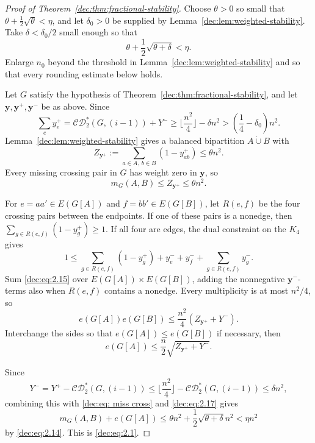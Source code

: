 \documentclass[11pt]{article}
\numberwithin{equation}{section}
\theoremstyle{remark}
\newcommand{\dotcupunion}{\mathbin{\dot\cup}}
\newcommand{\CDstar}{\mathcal{CD}^{*}}
\begin{document}
\begin{proof}[Proof of Theorem~\ref{dec:thm:fractional-stability}]
Choose \(\theta>0\) so small that
\(\theta+\frac12\sqrt\theta<\eta\), and let \(\delta_0>0\) be supplied by Lemma~\ref{dec:lem:weighted-stability}.
Take \(\delta<\delta_0/2\) small enough so that
\begin{equation}\label{dec:eq:2.14}
  \theta+\frac12\sqrt{\theta+\delta}<\eta.
\end{equation}
Enlarge \(n_0\) beyond the threshold in Lemma~\ref{dec:lem:weighted-stability} and
so that every rounding estimate below holds.

Let \(G\) satisfy the hypothesis of Theorem~\ref{dec:thm:fractional-stability},
and let \(\mathbf{y},\mathbf{y}^+,\mathbf{y}^-\) be as above. Since
\begin{equation*}
  \sum_e y_e^+=\CDstar_2(G,(i-1))+Y^-
  \ge \lfloor \frac{n^2}{4}\rfloor-\delta n^2>(\frac14-\delta_0)n^2.
\end{equation*}
Lemma~\ref{dec:lem:weighted-stability} gives a balanced bipartition \(A\dotcupunion B\) with
\begin{equation*}
Z_{\mathbf{y}^+}:=\sum_{a\in A,\ b\in B}(1-y^+_{ab})\le\theta n^2.
\end{equation*}
Every missing crossing pair in \(G\) has weight zero in \(\mathbf y\), so
\begin{equation}\label{dec:eq: miss cross}
 m_G(A,B)\le Z_{\mathbf{y}^+}\le\theta n^2.
\end{equation}

For \(e=aa'\in E(G[A])\) and \(f=bb'\in E(G[B])\), let \(R(e,f)\) be the four crossing
pairs between the endpoints.  If one of these pairs is a nonedge, then
\(\sum_{g\in R(e,f)}(1-y^+_g)\ge1\).  If all four are edges, the dual constraint on the \(K_4\) gives
\begin{equation}\label{dec:eq:2.15}
  1\le
  \sum_{g\in R(e,f)}(1-y^+_g)
  +y_e^-+y^-_f+\sum_{g\in R(e,f)}y^-_g.
\end{equation}
Sum \eqref{dec:eq:2.15} over \(E(G[A])\times E(G[B])\), adding the nonnegative \(\mathbf{y}^-\)-terms also when
\(R(e,f)\) contains a nonedge. Every multiplicity is at most \(n^2/4\), so
\begin{equation*}
  e(G[A])e(G[B])\le \frac{n^2}{4}(Z_{\mathbf{y}^+}+Y^-).
\end{equation*}
Interchange the sides so that \(e(G[A])\le e(G[B])\) if necessary, then
\begin{equation}\label{dec:eq:2.17}
  e(G[A])\le \frac n2\sqrt{Z_{\mathbf{y}^+}+Y^-}.
\end{equation}

Since
\begin{equation*}
Y^-=Y^+-\CDstar_2(G,(i-1))\le \lfloor\frac{n^2}{4}\rfloor-\CDstar_2(G,(i-1))\le  \delta n^2,
\end{equation*}
combining this with \eqref{dec:eq: miss cross} and \eqref{dec:eq:2.17} gives
\begin{equation*}
  m_G(A,B)+e(G[A])
  \le \theta n^2+\frac12\sqrt{\theta+\delta}n^2<\eta n^2
\end{equation*}
by \eqref{dec:eq:2.14}.  This is \eqref{dec:eq:2.1}.
\end{proof}
\end{document}
